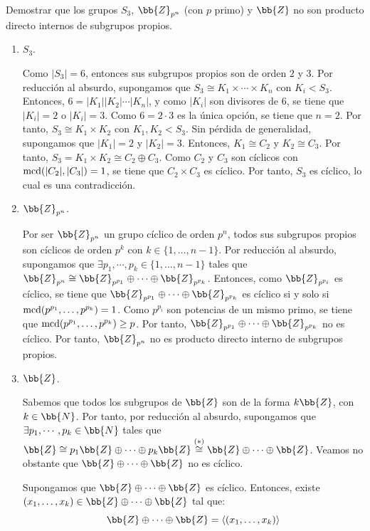\begin{ejercicio}
    Demostrar que los grupos $S_3$, $\bb{Z}_{p^n}$ (con $p$ primo) y $\bb{Z}$ no son producto directo internos de subgrupos propios.
    \begin{enumerate}
        \item $S_3$.
        
        Como $|S_3|=6$, entonces sus subgrupos propios son de orden $2$ y $3$. 
        Por reducción al absurdo, supongamos que $S_3\cong K_1\times\cdots\times K_n$ con $K_i<S_3$. Entonces, $6=|K_1||K_2|\cdots|K_n|$, y como $|K_i|$ son divisores de $6$, se tiene que $|K_i|=2$ o $|K_i|=3$. Como $6=2\cdot 3$ es la única opción, se tiene que $n=2$. Por tanto, $S_3\cong K_1\times K_2$ con $K_1,K_2<S_3$. Sin pérdida de generalidad, supongamos que $|K_1|=2$ y $|K_2|=3$. Entonces, $K_1\cong C_2$ y $K_2\cong C_3$. Por tanto, $S_3=K_1\times K_2\cong C_2\oplus C_3$. Como $C_2$ y $C_3$ son cíclicos con $\operatorname{mcd}(|C_2|,|C_3|)=1$, se tiene que $C_2\times C_3$ es cíclico. Por tanto, $S_3$ es cíclico, lo cual es una contradicción.

        \item $\bb{Z}_{p^n}$.
        
        Por ser $\bb{Z}_{p^n}$ un grupo cíclico de orden $p^n$, todos sus subgrupos propios son cíclicos de orden $p^k$ con $k\in \{1,\ldots,n-1\}$. Por reducción al absurdo, supongamos que $\exists p_1,\cdots,p_k\in \{1,\ldots,n-1\}$ tales que $\bb{Z}_{p^n}\cong \bb{Z}_{p^{p_1}}\oplus \cdots \oplus \bb{Z}_{p^{p_k}}$. Entonces, como $\bb{Z}_{p^{p_i}}$ es cíclico, se tiene que $\bb{Z}_{p^{p_1}}\oplus \cdots \oplus \bb{Z}_{p^{p_k}}$ es cíclico si y solo si $\operatorname{mcd}(p^{p_1},\ldots,p^{p_k})=1$. Como $p^{p_i}$ son potencias de un mismo primo, se tiene que $\operatorname{mcd}(p^{p_1},\ldots,p^{p_k})\geq p$. Por tanto, $\bb{Z}_{p^{p_1}}\oplus \cdots \oplus \bb{Z}_{p^{p_k}}$ no es cíclico. Por tanto, $\bb{Z}_{p^n}$ no es producto directo interno de subgrupos propios.

        \item $\bb{Z}$.
        
        Sabemos que todos los subgrupos de $\bb{Z}$ son de la forma $k\bb{Z}$, con $k\in \bb{N}$. Por tanto, por reducción al absurdo, supongamos que $\exists p_1,\cdots,p_k\in \bb{N}$ tales que $\bb{Z}\cong p_1\bb{Z}\oplus \cdots \oplus p_k\bb{Z} \stackrel{(\ast)}{\cong} \bb{Z}\oplus \cdots \oplus \bb{Z}$. Veamos no obstante que $\bb{Z}\oplus \cdots \oplus \bb{Z}$ no es cíclico.
        
        Supongamos que $\bb{Z}\oplus \cdots \oplus \bb{Z}$ es cíclico. Entonces, existe $(x_1,\ldots,x_k)\in \bb{Z}\oplus \cdots \oplus \bb{Z}$ tal que:
        \begin{equation*}
            \bb{Z}\oplus \cdots \oplus \bb{Z} = \langle (x_1,\ldots,x_k)\rangle
        \end{equation*}


\end{enumerate}
\end{ejercicio}
